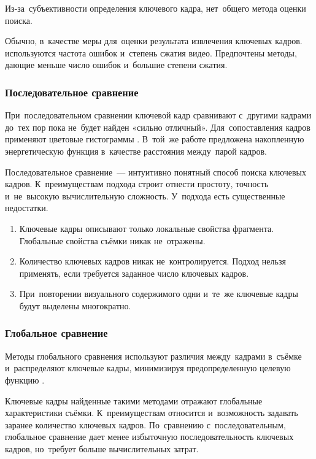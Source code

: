 Из-за~субъективности определения ключевого кадра,
нет~общего метода оценки поиска.

Обычно, в~качестве меры для~оценки результата извлечения ключевых кадров.
используются частота ошибок и~степень сжатия видео.
Предпочтены методы, дающие меньше число ошибок и~большие степени сжатия.


\subsubsection{Последовательное сравнение}

При~последовательном сравнении ключевой кадр сравнивают
с~другими кадрами до~тех пор пока не~будет найден «сильно отличный».
Для~сопоставления кадров применяют цветовые гистограммы \cite{Zhang:2003}.
В~той~же работе предложена накопленную энергетическую функция в~качестве
расстояния между~парой кадров.

Последовательное сравнение~— интуитивно понятный способ
поиска ключевых кадров.
К~преимуществам подхода строит отнести простоту, точность
и~не~высокую вычислительную сложность.
У~подхода есть существенные недостатки.
\begin{enumerate}
    \item Ключевые кадры описывают только локальные свойства фрагмента.
            Глобальные свойства съёмки никак не~отражены.
    \item Количество ключевых кадров никак не~контролируется.
            Подход нельзя применять, если требуется заданное число
            ключевых кадров.
    \item При~повторении визуального содержимого одни и~те~же
            ключевые кадры будут выделены многократно.
\end{enumerate}

\subsubsection{Глобальное сравнение}

Методы глобального сравнения используют различия между~кадрами
в~съёмке и~распределяют ключевые кадры,
минимизируя предопределенную целевую функцию \cite{Truong:2007}.

Ключевые кадры найденные такими методами отражают глобальные
характеристики съёмки. К~преимуществам относится и~возможность
задавать заранее количество ключевых кадров.
По~сравнению с~последовательным, глобальное сравнение
дает менее избыточную последовательность ключевых кадров,
но~требует больше вычислительных затрат.


